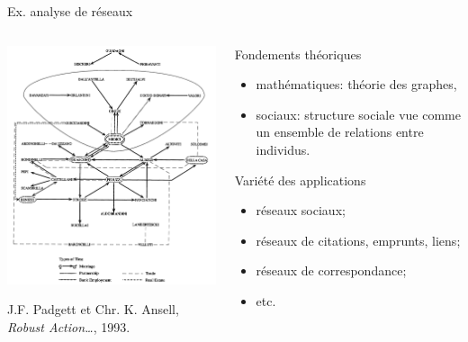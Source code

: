 \documentclass[ignorenonframetext]{beamer}
\begin{document}
\begin{frame}{Ex. analyse de réseaux}
	
	\begin{columns}
		\begin{column}{0.5\textwidth}
			\includegraphics[width=\textwidth]{img/Padgett_Medici.png}
			
			{J.F. Padgett et Chr. K. Ansell, \textit{Robust Action…}, 1993.}
		\end{column}
		\begin{column}{0.5\textwidth}
		\begin{block}{Fondements théoriques}
			\begin{itemize}
				\item mathématiques: théorie des graphes, 
				\item sociaux: structure sociale vue comme un ensemble de relations entre individus.
			\end{itemize}
		\end{block}
	\begin{block}{Variété des applications}
		\begin{itemize}
			\item réseaux sociaux;
			\item réseaux de citations, emprunts, liens;
			\item réseaux de correspondance;
			\item etc.
		\end{itemize}
	\end{block}
	
		\end{column}
	\end{columns}
	
\end{frame}
\end{document}
